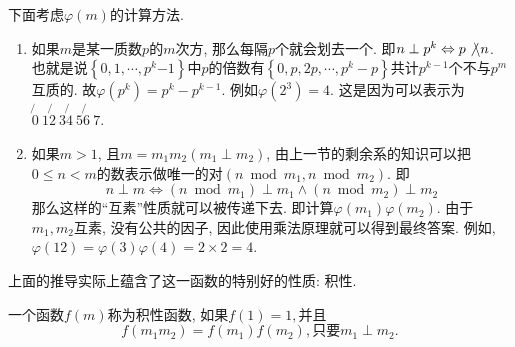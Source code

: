 \documentclass{ctexart}
\newcommand{\bzc}{\not\backslash}
\begin{document}
下面考虑$\varphi (m)$的计算方法. 

\begin{enumerate}
    \item 如果$m$是某一质数$p$的$m$次方, 那么每隔$p$个就会划去一个. 即$n \perp p^k \Leftrightarrow p \bzc n$. 也就是说$\left\{0,1, \cdots, p^k {-1}\right\}$中$p$的倍数有$\left\{0, p, 2 p, \cdots, p^k-p\right\}$共计$p^{k-1}$个不与$p^m$互质的. 故$\varphi\left(p^k\right)=p^k-p^{k-1}$. 例如$\varphi\left(2^3\right)=4$. 这是因为可以表示为$\not{0}~1\not{2}~3\not{4}~5\not{6}~7$.
    \item 如果$m>1$, 且$m=m_1 m_2\left(m_1 \perp m_2\right)$, 由上一节的剩余系的知识可以把$0\leq n<m$的数表示做唯一的对$\left(n \bmod m_1, n \bmod m_2\right)$. 即$$
n \perp m \Leftrightarrow\left(n \bmod m_1\right) \perp m_1 \wedge\left(n \bmod m_2\right) \perp m_2
$$
那么这样的``互素''性质就可以被传递下去. 即计算$\varphi\left(m_1\right) \varphi\left(m_2\right)$. 由于$m_1, m_2$互素, 没有公共的因子, 因此使用乘法原理就可以得到最终答案.  例如, $\varphi(12)=\varphi(3)\varphi(4)=2 \times  2=4$. 
\end{enumerate}

上面的推导实际上蕴含了这一函数的特别好的性质: 积性. 

\begin{definition}[积性函数]

    一个函数$f(m)$称为积性函数, 如果$f(1)=1, $并且
    \[
        f(m_1m_2)=f(m_1)f(m_2), \text{只要}m_1\perp m_2.
    \]
\end{definition}
\end{document}
